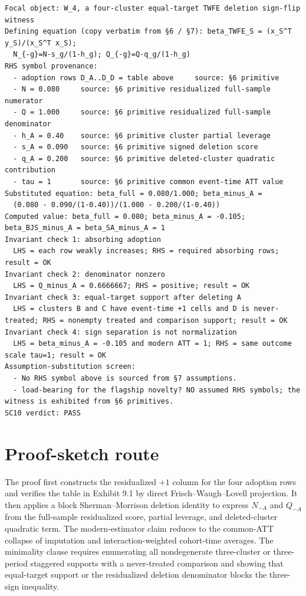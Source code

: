 \documentclass[11pt]{article}
\theoremstyle{definition}
\theoremstyle{plain}
\theoremstyle{remark}
\begin{document}
\begin{verbatim}
Focal object: W_4, a four-cluster equal-target TWFE deletion sign-flip witness
Defining equation (copy verbatim from §6 / §7): beta_TWFE_S = (x_S^T y_S)/(x_S^T x_S);
  N_{-g}=N-s_g/(1-h_g); Q_{-g}=Q-q_g/(1-h_g)
RHS symbol provenance:
  - adoption rows D_A..D_D = table above     source: §6 primitive
  - N = 0.080     source: §6 primitive residualized full-sample numerator
  - Q = 1.000     source: §6 primitive residualized full-sample denominator
  - h_A = 0.40    source: §6 primitive cluster partial leverage
  - s_A = 0.090   source: §6 primitive signed deletion score
  - q_A = 0.200   source: §6 primitive deleted-cluster quadratic contribution
  - tau = 1       source: §6 primitive common event-time ATT value
Substituted equation: beta_full = 0.080/1.000; beta_minus_A =
  (0.080 - 0.090/(1-0.40))/(1.000 - 0.200/(1-0.40))
Computed value: beta_full = 0.080; beta_minus_A = -0.105; beta_BJS_minus_A = beta_SA_minus_A = 1
Invariant check 1: absorbing adoption
  LHS = each row weakly increases; RHS = required absorbing rows; result = OK
Invariant check 2: denominator nonzero
  LHS = Q_minus_A = 0.6666667; RHS = positive; result = OK
Invariant check 3: equal-target support after deleting A
  LHS = clusters B and C have event-time +1 cells and D is never-treated; RHS = nonempty treated and comparison support; result = OK
Invariant check 4: sign separation is not normalization
  LHS = beta_minus_A = -0.105 and modern ATT = 1; RHS = same outcome scale tau=1; result = OK
Assumption-substitution screen:
  - No RHS symbol above is sourced from §7 assumptions.
  - load-bearing for the flagship novelty? NO assumed RHS symbols; the witness is exhibited from §6 primitives.
SC10 verdict: PASS
\end{verbatim}

\section{Proof-sketch route}
The proof first constructs the residualized \(+1\) column for the four adoption rows and verifies the table in Exhibit 9.1 by direct Frisch--Waugh--Lovell projection.  It then applies a block Sherman--Morrison deletion identity to express \(N_{-A}\) and \(Q_{-A}\) from the full-sample residualized score, partial leverage, and deleted-cluster quadratic term.  The modern-estimator claim reduces to the common-ATT collapse of imputation and interaction-weighted cohort-time averages.  The minimality clause requires enumerating all nondegenerate three-cluster or three-period staggered supports with a never-treated comparison and showing that equal-target support or the residualized deletion denominator blocks the three-sign inequality.
\end{document}
